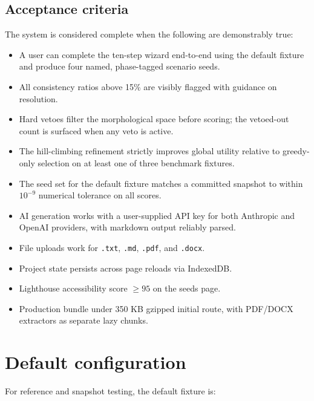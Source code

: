 \documentclass[11pt,a4paper]{article}
\begin{document}
\subsection{Acceptance criteria}

The system is considered complete when the following are demonstrably true:

\begin{itemize}[leftmargin=*]
  \item A user can complete the ten-step wizard end-to-end using the default fixture and produce four named, phase-tagged scenario seeds.
  \item All consistency ratios above 15\% are visibly flagged with guidance on resolution.
  \item Hard vetoes filter the morphological space before scoring; the vetoed-out count is surfaced when any veto is active.
  \item The hill-climbing refinement strictly improves global utility relative to greedy-only selection on at least one of three benchmark fixtures.
  \item The seed set for the default fixture matches a committed snapshot to within $10^{-9}$ numerical tolerance on all scores.
  \item AI generation works with a user-supplied API key for both Anthropic and OpenAI providers, with markdown output reliably parsed.
  \item File uploads work for \texttt{.txt}, \texttt{.md}, \texttt{.pdf}, and \texttt{.docx}.
  \item Project state persists across page reloads via IndexedDB.
  \item Lighthouse accessibility score $\ge 95$ on the seeds page.
  \item Production bundle under 350 KB gzipped initial route, with PDF/DOCX extractors as separate lazy chunks.
\end{itemize}

\section{Default configuration}

For reference and snapshot testing, the default fixture is:
\end{document}
